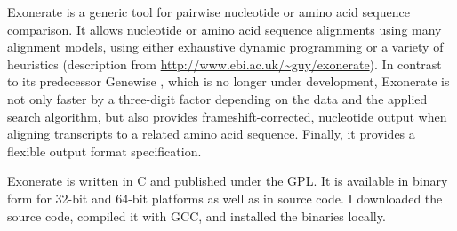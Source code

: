 Exonerate \citep{slater2005} is a generic tool for pairwise nucleotide or amino
acid sequence comparison.  It allows nucleotide or amino acid sequence
alignments using many alignment models, using either exhaustive dynamic
programming or a variety of heuristics (description from
\url{http://www.ebi.ac.uk/~guy/exonerate}). In contrast to its predecessor
Genewise \citep{birney2004}, which is no longer under development, Exonerate is
not only faster by a three-digit factor depending on the data and the applied
search algorithm, but also provides frameshift-corrected, nucleotide output when
aligning transcripts to a related amino acid sequence. Finally, it provides a
flexible output format specification.

Exonerate is written in C and published under the GPL. It is available in binary
form for 32-bit and 64-bit platforms as well as in source code. I downloaded the
source code, compiled it with GCC, and installed the binaries locally.
